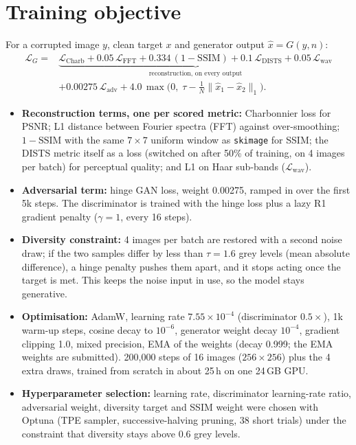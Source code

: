 \documentclass[10pt,a4paper]{article}
\begin{document}
\section{Training objective}
For a corrupted image $y$, clean target $x$ and generator output $\hat{x}=G(y,n)$:
\begin{equation*}
\begin{aligned}
  \mathcal{L}_G ={}& \underbrace{\mathcal{L}_{\text{Charb}} + 0.05\,\mathcal{L}_{\text{FFT}}
     + 0.334\,(1-\mathrm{SSIM}) + 0.1\,\mathcal{L}_{\text{DISTS}}
     + 0.05\,\mathcal{L}_{\text{wav}}}_{\text{reconstruction, on every output}} \\
  & + 0.00275\,\mathcal{L}_{\text{adv}}
     + 4.0\,\max\!\bigl(0,\;\tau-\tfrac{1}{N}\lVert \hat{x}_1-\hat{x}_2\rVert_1\bigr).
\end{aligned}
\end{equation*}
\begin{itemize}
  \item \textbf{Reconstruction terms, one per scored metric:} Charbonnier loss for PSNR; L1
        distance between Fourier spectra (FFT) against over-smoothing; $1-\mathrm{SSIM}$ with the
        same $7\times7$ uniform window as \texttt{skimage} for SSIM; the DISTS metric itself as a
        loss (switched on after 50\% of training, on 4 images per batch) for perceptual quality; and L1 on Haar sub-bands
        ($\mathcal{L}_{\text{wav}}$).
  \item \textbf{Adversarial term:} hinge GAN loss, weight 0.00275, ramped in over the first 5k
        steps. The discriminator is trained with the hinge loss plus a lazy R1 gradient penalty
        ($\gamma=1$, every 16 steps).
  \item \textbf{Diversity constraint:} 4 images per batch are restored with a second noise draw;
        if the two samples differ by less than $\tau = 1.6$ grey levels (mean absolute
        difference), a hinge penalty pushes them apart, and it stops acting once the target is
        met. This keeps the noise input in use, so the model stays generative.
  \item \textbf{Optimisation:} AdamW, learning rate $7.55\times10^{-4}$ (discriminator
        $0.5\times$), 1k warm-up steps, cosine decay to $10^{-6}$, generator weight decay $10^{-4}$,
        gradient clipping 1.0, mixed precision, EMA of the weights (decay 0.999; the EMA weights
        are submitted). 200{,}000 steps of 16 images ($256\times256$) plus the 4 extra draws,
        trained from scratch in about 25\,h on one 24\,GB GPU.
  \item \textbf{Hyperparameter selection:} learning rate, discriminator learning-rate ratio,
        adversarial weight, diversity target and SSIM weight were chosen with Optuna (TPE
        sampler, successive-halving pruning, 38 short trials) under the constraint that diversity
        stays above 0.6 grey levels.
\end{itemize}
\end{document}
